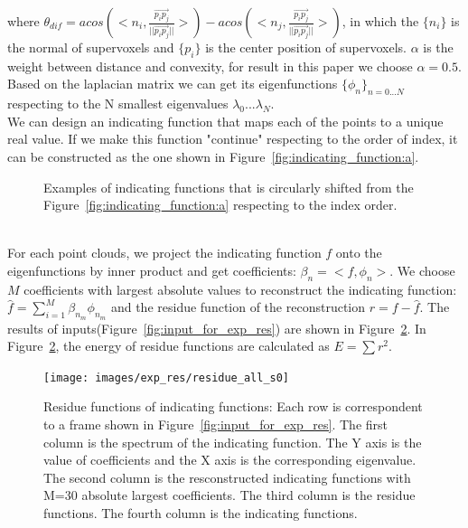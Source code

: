 where $\theta_{dif}=acos(<n_i,\frac{\overrightarrow{p_ip_j}}{||\overrightarrow{p_ip_j}||}>) - acos(<n_j,\frac{\overrightarrow{p_ip_j}}{||\overrightarrow{p_ip_j}||}>)$, in which the $\{n_i\}$ is the normal of supervoxels and $\{p_i\}$ is the center position of supervoxels. $\alpha$ is the weight between distance and convexity, for result in this paper we choose $\alpha=0.5$.\\
Based on the laplacian matrix we can get its eigenfunctions $\{\phi_n\}_{n=0...N}$ respecting to the N smallest eigenvalues $\lambda_0...\lambda_N$.\\ 
We can design an indicating function that maps each of the points to a unique real value. If we make this function "continue" respecting to the order of index, it can be constructed as the one shown in Figure~\ref{fig:indicating_function:a}.
\begin{figure}
\centering
{}
\caption{Examples of indicating functions that is circularly shifted from the Figure~\ref{fig:indicating_function:a} respecting to the index order.}
\label{fig:indicating_function}
\end{figure}\\
For each point clouds, we project the indicating function $f$ onto the eigenfunctions by inner product and get coefficients: $\beta_n=<f,\phi_n>$. We choose $M$ coefficients with largest absolute values to reconstruct the indicating function: $\hat{f}=\sum_{i=1}^{M}\beta_{n_m}\phi_{n_m}$ and the residue function of the reconstruction $r=f-\hat{f}$. The results of inputs(Figure~\ref{fig:input_for_exp_res}) are shown in Figure~\ref{fig:res_for_exp_res}. In Figure~\ref{fig:res_for_exp_res}, the energy of residue functions are calculated as $E=\sum r^2$.
\begin{figure}
	\centering
	\texttt{[image: images/exp\_res/residue\_all\_s0]}
	\caption{Residue functions of indicating functions: Each row is correspondent to a frame shown in Figure~\ref{fig:input_for_exp_res}. The first column is the spectrum of the indicating function. The Y axis is the value of coefficients and the X axis is the corresponding eigenvalue. The second column is the resconstructed indicating functions with M=30 absolute largest coefficients. The third column is the residue functions. The fourth column is the indicating functions.}
	\label{fig:res_for_exp_res}
\end{figure}\\
